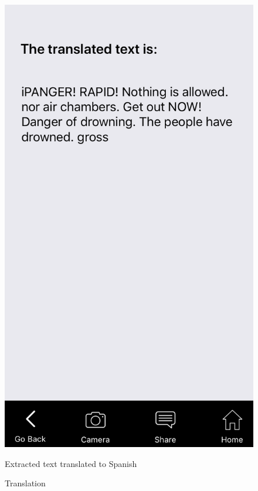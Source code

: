 \documentclass[12pt]{article}
\begin{document}
 \begin{figure} [H]
\centering
\begin{minipage}{.5\textwidth}
  \centering
  \includegraphics[width=0.9\linewidth]{media/3.PNG}
  \caption{Translation}{Extracted text translated to Spanish}
  \label{fig:translated}
\end{minipage}%
\begin{minipage}{.5\textwidth}
  \centering

\end{minipage}
\end{figure}
\end{document}
